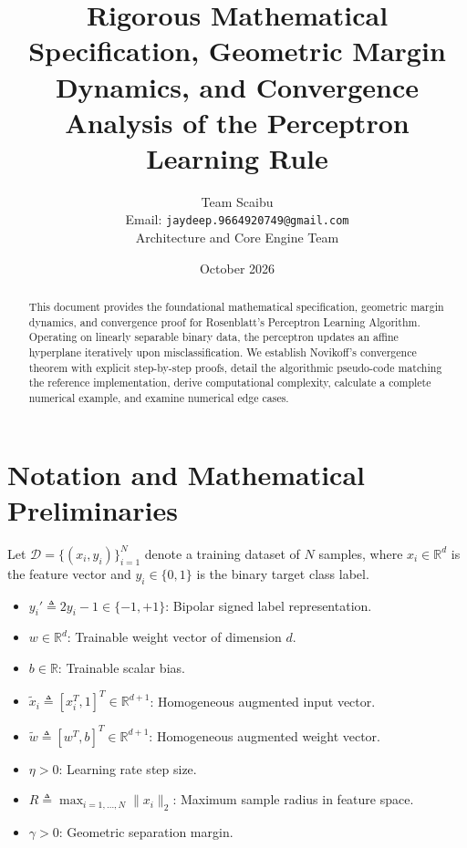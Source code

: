 \documentclass[11pt,a4paper]{article}
\title{\textbf{Rigorous Mathematical Specification, Geometric Margin Dynamics, and Convergence Analysis of the Perceptron Learning Rule}}
\author{Team Scaibu \\ \small Email: \texttt{jaydeep.9664920749@gmail.com} \\ \small Architecture and Core Engine Team}
\date{October 2026}
\theoremstyle{definition}
\begin{document}
\maketitle

\begin{abstract}
This document provides the foundational mathematical specification, geometric margin dynamics, and convergence proof for Rosenblatt's Perceptron Learning Algorithm. Operating on linearly separable binary data, the perceptron updates an affine hyperplane iteratively upon misclassification. We establish Novikoff's convergence theorem with explicit step-by-step proofs, detail the algorithmic pseudo-code matching the reference implementation, derive computational complexity, calculate a complete numerical example, and examine numerical edge cases.
\end{abstract}

\section{Notation and Mathematical Preliminaries}

Let $\mathcal{D} = \{(x_i, y_i)\}_{i=1}^N$ denote a training dataset of $N$ samples, where $x_i \in \mathbb{R}^d$ is the feature vector and $y_i \in \{0, 1\}$ is the binary target class label.

\begin{itemize}
    \item $y_i' \triangleq 2y_i - 1 \in \{-1, +1\}$: Bipolar signed label representation.
    \item $w \in \mathbb{R}^d$: Trainable weight vector of dimension $d$.
    \item $b \in \mathbb{R}$: Trainable scalar bias.
    \item $\tilde{x}_i \triangleq [x_i^T, 1]^T \in \mathbb{R}^{d+1}$: Homogeneous augmented input vector.
    \item $\tilde{w} \triangleq [w^T, b]^T \in \mathbb{R}^{d+1}$: Homogeneous augmented weight vector.
    \item $\eta > 0$: Learning rate step size.
    \item $R \triangleq \max_{i=1, \dots, N} \|x_i\|_2$: Maximum sample radius in feature space.
    \item $\gamma > 0$: Geometric separation margin.
\end{itemize}
\end{document}
